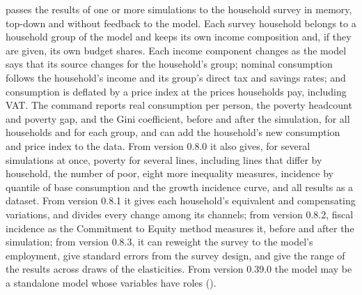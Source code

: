 

 passes the results of one or more simulations to the
household survey in memory, top-down and without feedback to the model. Each survey household
belongs to a household group of the model and keeps its own income
composition and, if they are given, its own budget shares. Each income
component changes as the model says that its source changes for the
household's group; nominal consumption follows the household's income and its
group's direct tax and savings rates; and consumption is deflated by a price
index at the prices households pay, including VAT. The command reports real
consumption per person, the poverty headcount and poverty gap, and the Gini
coefficient, before and after the simulation, for all households and for
each group, and can add the household's new consumption and price index to
the data. From version 0.8.0 it also gives, for several simulations at once,
poverty for several lines, including lines that differ by household, the
number of poor, eight more inequality measures, incidence by quantile of
base consumption and the growth incidence curve, and all results as a
dataset. From version 0.8.1 it gives each household's equivalent and
compensating variations, and divides every change among its channels; from
version 0.8.2, fiscal incidence as the Commitment to Equity method measures
it, before and after the simulation; from version 0.8.3, it can reweight the
survey to the model's employment, give standard errors from the survey
design, and give the range of the results across draws of the elasticities.
From version 0.39.0 the model may be a standalone model whose variables have
roles ().


